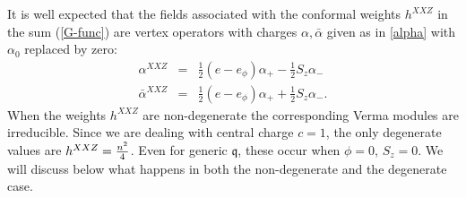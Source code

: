 \documentclass[a4paper,10pt]{article}
\newcommand{\q}{\mathfrak{q}}
\newcommand{\linnea}[1]{$\framebox{\tiny L}$\ \textbf{\texttt{{\color{red}\footnotesize#1}}}}
\begin{document}
It is well expected that the fields associated with the conformal weights $h^{XXZ}$ in the sum (\ref{G-func}) are vertex operators with charges
$\alpha,\bar{\alpha}$ given as in \eqref{alpha} with $\alpha_0$ replaced by zero:
\begin{subequations}\label{alphaXXZ}
\begin{eqnarray}
\alpha^{XXZ} & = & \frac{1}{2}(e -  e_\phi )  \alpha_{+}  - \frac{1}{2}S_z \alpha_{-}  \\
\bar{\alpha}^{XXZ} & = & \frac{1}{2}  (e - e_\phi ) \alpha_{+} + \frac{1}{2}S_z \alpha_{-} .
\end{eqnarray}
\end{subequations}
When the weights $h^{XXZ}$ are non-degenerate the corresponding Verma modules are irreducible. %
Since we are dealing with central charge $c=1$, the only degenerate values are $h^{XXZ}={n^2\over 4}$. Even for generic $\q$, these occur when $\phi=0$, $S_z=0$. We will discuss below what happens in both the non-degenerate and the degenerate case.  









\end{document}
